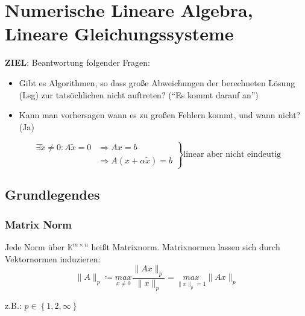 \section{Numerische Lineare Algebra, Lineare Gleichungssysteme}
\textbf{ZIEL}: Beantwortung folgender Fragen:
\begin{itemize}
\item{Gibt es Algorithmen, so dass große Abweichungen der berechneten Lösung (Lsg) zur tatsöchlichen nicht auftreten? 
  (``Es kommt darauf an'')}
\item{Kann man vorhersagen wann es zu großen Fehlern kommt, und wann nicht? (Ja)}
\end{itemize}

\begin{equation*}
  \left.
    \begin{aligned}
      \exists \widetilde{x} \neq 0: A\widetilde{x} = 0 & \Rightarrow  Ax = b \\
        & \Rightarrow A(x + \alpha \widetilde{x}) = b
    \end{aligned}
  \right\}
  \text{linear aber nicht eindeutig} %
\end{equation*}

\subsection{Grundlegendes}

\subsubsection{Matrix Norm}

Jede Norm über $\mathbb{K}^{m \times n}$ heißt Matrixnorm.
Matrixnormen lassen sich durch Vektornormen induzieren:
\begin{equation*}
\|A\|_p \coloneqq \underset{x \neq 0}{max} \frac{\|Ax\|_p}{\|x\|_p} = \underset{\|x\|_p = 1}{max}\|Ax\|_p
\end{equation*}

z.B.: $p \in \left\{1, 2, \infty \right\}$

